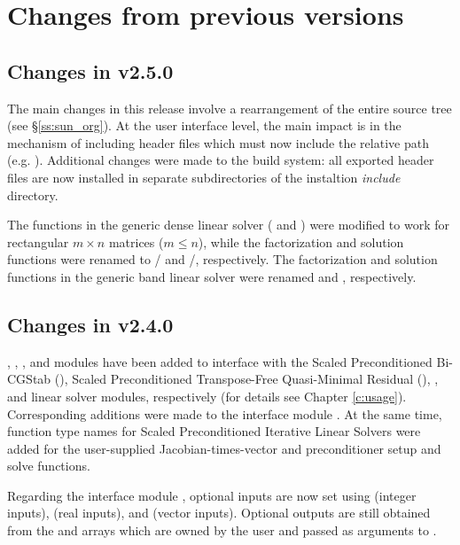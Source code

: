 \section{Changes from previous versions}

\subsection*{Changes in v2.5.0}

The main changes in this release involve a rearrangement of the entire 
{\sundials} source tree (see \S\ref{ss:sun_org}). At the user interface 
level, the main impact is in the mechanism of including {\sundials} header
files which must now include the relative path (e.g. ).
Additional changes were made to the build system: all exported header files are
now installed in separate subdirectories of the instaltion {\em include} directory.

The functions in the generic dense linear solver ( and
) were modified to work for rectangular $m \times n$
matrices ($m \le n$), while the factorization and solution functions were
renamed to / and /, 
respectively.
The factorization and solution functions in the generic band linear solver were 
renamed  and , respectively.

\subsection*{Changes in v2.4.0}

{\kinspbcg}, {\kinsptfqmr}, {\kindense}, and {\kinband} modules have been
added to interface with the Scaled Preconditioned Bi-CGStab ({\spbcg}),
Scaled Preconditioned Transpose-Free Quasi-Minimal Residual ({\sptfqmr}),
{\dense}, and {\band} linear solver modules, respectively (for details
see Chapter \ref{c:usage}). Corresponding additions were made to the {\F}
interface module {\fkinsol}. At the same time, function type names for
Scaled Preconditioned Iterative Linear Solvers were added for the
user-supplied Jacobian-times-vector and preconditioner setup and solve
functions.

Regarding the {\F} interface module {\fkinsol}, optional inputs are now
set using  (integer inputs),  (real inputs),
and  (vector inputs). Optional outputs are still obtained
from the  and  arrays which are owned by the user
and passed as arguments to .

